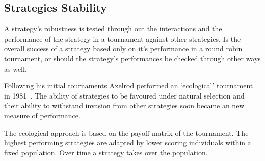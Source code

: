\documentclass{article}
\begin{document}

%     


%     

\subsection{Strategies Stability}

A strategy's robustness is tested through out the interactions and the performance
of the strategy in a tournament against other strategies. Is the overall
success of a strategy based only on it's performance in a round robin tournament,
or should the strategy's performances be checked through other ways as well.

Following his initial tournaments Axelrod performed an `ecological' tournament
in 1981~\cite{Axelrod1981}.  The ability of strategies to be favoured under
natural selection and their ability to withstand invasion from other strategies
soon became an new measure of performance. 

The ecological approach is based on the payoff matrix of the tournament.  The
highest performing strategies are adapted by lower scoring individuals
within a fixed population. Over time a strategy takes over the population.
\end{document}
